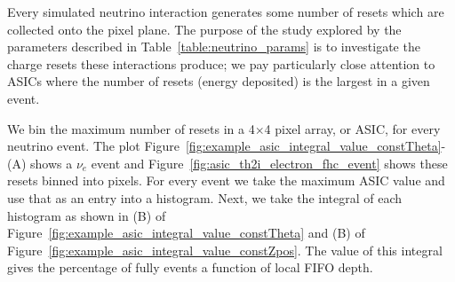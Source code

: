 Every simulated neutrino interaction generates some number of resets which are collected onto the pixel plane.
The purpose of the study explored by the parameters described in Table~\ref{table:neutrino_params} is to investigate the charge resets these interactions produce; we pay particularly close attention to ASICs where the number of resets (energy deposited) is the largest in a given event.

We bin the maximum number of resets in a 4$\times$4 pixel array, or ASIC, for every neutrino event.
The plot Figure~\ref{fig:example_asic_integral_value_constTheta}-(A) shows a $\nu_{e}$ event and Figure~\ref{fig:asic_th2i_electron_fhc_event} shows these resets binned into pixels.
For every event we take the maximum ASIC value and use that as an entry into a histogram.
Next, we take the integral of each histogram as shown in (B) of Figure~\ref{fig:example_asic_integral_value_constTheta} and (B) of Figure~\ref{fig:example_asic_integral_value_constZpos}.
The value of this integral gives the percentage of fully events a function of local FIFO depth.

